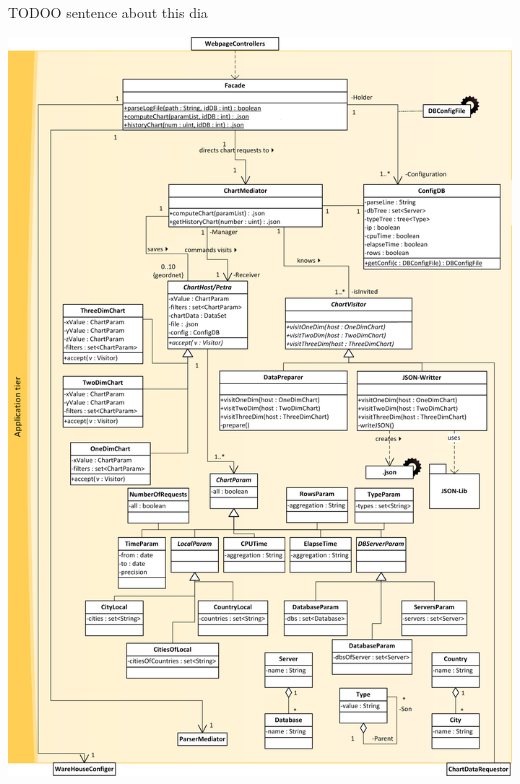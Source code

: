 TODOO sentence about this dia
\newpage
\begin{center}
\includegraphics[width=0.9\linewidth]{Pictures/AppTierDia1.png}
\end{center}  
